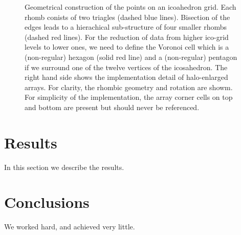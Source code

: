 \documentclass[12pt]{article}
\begin{document}
\begin{figure} [ht]
\begin{minipage}[r]{.49\textwidth}
  \end{minipage}
  \label{fig:world_map_on_icosahedral_grid}
  \caption{Geometrical construction of the points on an icoahedron grid. Each rhomb conists of two triagles (dashed blue lines). Bisection
  of the edges leads to a hierachical sub-structure of four smaller rhombs (dashed red lines). For the reduction of data from higher
  ico-grid levels to lower ones, we need to define the Voronoi cell which is a (non-regular) hexagon (solid red line) and a (non-regular) 
  pentagon if we surround one of the twelve vertices of the icosahedron.
  The right hand side shows the implementation detail of halo-enlarged arrays. For clarity, the rhombic geometry and rotation are showm. 
  For simplicity of the implementation, the array corner cells on top and bottom are present but should never be referenced.} %
\end{figure}  



  
\section{Results}\label{sec:results}
In this section we describe the results.

\section{Conclusions}\label{sec:conclusions}
We worked hard, and achieved very little.



\end{document}
